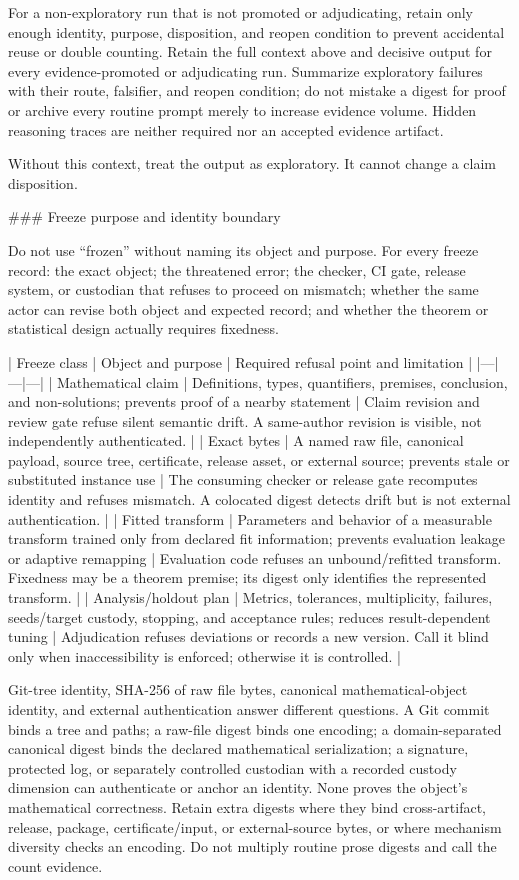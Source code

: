 \documentclass[11pt]{article}
\begin{document}
\begin{markdown}
For a non-exploratory run that is not promoted or adjudicating, retain only enough identity,
purpose, disposition, and reopen condition to prevent accidental reuse or double counting. Retain
the full context above and decisive output for every evidence-promoted or adjudicating run.
Summarize exploratory failures with their route, falsifier, and reopen condition; do not mistake a
digest for proof or archive every routine prompt merely to increase evidence volume. Hidden
reasoning traces are neither required nor an accepted evidence artifact.

Without this context, treat the output as exploratory. It cannot change a claim disposition.

### Freeze purpose and identity boundary

Do not use “frozen” without naming its object and purpose. For every freeze record: the exact
object; the threatened error; the checker, CI gate, release system, or custodian that refuses to
proceed on mismatch; whether the same actor can revise both object and expected record; and whether
the theorem or statistical design actually requires fixedness.

| Freeze class | Object and purpose | Required refusal point and limitation |
|---|---|---|
| Mathematical claim | Definitions, types, quantifiers, premises, conclusion, and non-solutions; prevents proof of a nearby statement | Claim revision and review gate refuse silent semantic drift. A same-author revision is visible, not independently authenticated. |
| Exact bytes | A named raw file, canonical payload, source tree, certificate, release asset, or external source; prevents stale or substituted instance use | The consuming checker or release gate recomputes identity and refuses mismatch. A colocated digest detects drift but is not external authentication. |
| Fitted transform | Parameters and behavior of a measurable transform trained only from declared fit information; prevents evaluation leakage or adaptive remapping | Evaluation code refuses an unbound/refitted transform. Fixedness may be a theorem premise; its digest only identifies the represented transform. |
| Analysis/holdout plan | Metrics, tolerances, multiplicity, failures, seeds/target custody, stopping, and acceptance rules; reduces result-dependent tuning | Adjudication refuses deviations or records a new version. Call it blind only when inaccessibility is enforced; otherwise it is controlled. |

Git-tree identity, SHA-256 of raw file bytes, canonical mathematical-object identity, and external
authentication answer different questions. A Git commit binds a tree and paths; a raw-file digest
binds one encoding; a domain-separated canonical digest binds the declared mathematical
serialization; a signature, protected log, or separately controlled custodian with a recorded
custody dimension can authenticate or anchor an identity. None proves the object's mathematical
correctness. Retain extra digests where they bind
cross-artifact, release, package, certificate/input, or external-source bytes, or where mechanism
diversity checks an encoding. Do not multiply routine prose digests and call the count evidence.


\end{markdown}
\end{document}
